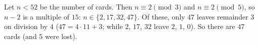 Let $n<52$ be the number of cards. Then $n\equiv2\pmod 3$ and $n\equiv2\pmod 5$, so $n-2$ is a multiple of $15$: $n\in\{2,17,32,47\}$. Of these, only $47$ leaves remainder $3$ on division by $4$ ($47=4\cdot11+3$; while $2$, $17$, $32$ leave $2$, $1$, $0$). So there are $\boxed{47}$ cards (and $5$ were lost).
